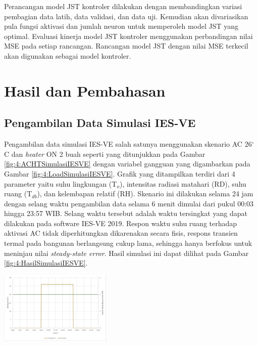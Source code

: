 \documentclass[a4paper,10pt]{article}
\makeatletter
\newenvironment{body}{\begin{multicols}{2}}{\end{multicols}}
\renewenvironment{figure}
{\def\@captype{figure}%
	\captionsetup{labelsep=period,format=hang,font=footnotesize,justification=justified}
}
{}
\makeatother
\begin{document}
\begin{body}
		Perancangan model JST kontroler dilakukan dengan membandingkan variasi pembagian data latih, data validasi, dan data uji. Kemudian akan divariasikan pula fungsi aktivasi dan jumlah neuron untuk memperoleh model JST yang optimal. Evaluasi kinerja model JST kontroler menggunakan perbandingan nilai MSE pada setiap rancangan. Rancangan model JST dengan nilai MSE terkecil akan digunakan sebagai model kontroler.\\
		
		\section{Hasil dan Pembahasan}
		
		\subsection{Pengambilan Data Simulasi IES-VE}
		
		Pengambilan data simulasi IES-VE salah satunya menggunakan skenario AC 26$^\circ$C dan \textit{heater} ON 2 buah seperti yang ditunjukkan pada Gambar \ref{fig:4:ACHTSimulasiIESVE} dengan variabel gangguan yang digambarkan pada Gambar \ref{fig:4:LoadSimulasiIESVE}. Grafik yang ditampilkan terdiri dari 4 parameter yaitu suhu lingkungan (T$_o$), intensitas radiasi matahari (RD), suhu ruang (T$_{db}$), dan kelembapan relatif (RH). Skenario ini dilakukan selama 24 jam dengan selang waktu pengambilan data selama 6 menit dimulai dari pukul 00:03 hingga 23:57 WIB. Selang waktu tersebut adalah waktu tersingkat yang dapat dilakukan pada software IES-VE 2019. Respon waktu suhu ruang terhadap aktivasi AC tidak diperhitungkan dikarenakan secara fisis, respons transien termal pada bangunan berlangsung cukup lama, sehingga hanya berfokus untuk meninjau nilai \textit{steady-state error}. Hasil simulasi ini dapat dilihat pada Gambar \ref{fig:4:HasilSimulasiIESVE}.\\
		
		\begin{figure}
			\centering
			\includegraphics[width=0.4\textwidth]{figures/ACHTSimulasiIESVE}
			\caption{Data Konfigurasi AC dan \textit{Heater} pada Simulasi ISE-VE}
			\label{fig:4:ACHTSimulasiIESVE}
		\end{figure}
		

\end{body}
\end{document}
